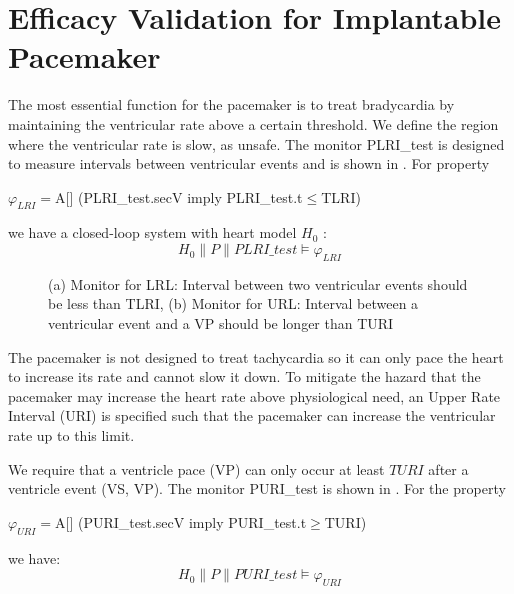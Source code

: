 \section{Efficacy Validation for Implantable Pacemaker}
The most essential function for the pacemaker is to treat bradycardia by maintaining the ventricular rate above a certain threshold. We define the region where the ventricular rate is slow, as \textsf{unsafe}. The monitor \textsf{PLRI\_test} is designed to measure intervals between ventricular events and is shown in . For property
\begin{center}
\textsf{$\varphi_{LRI}=$A[] (PLRI\_test.secV imply PLRI\_test.t$\leq$TLRI)}
\end{center}
we have a closed-loop system with heart model $H_0$ : 
$$H_0\| P\| PLRI\_test\models\varphi_{LRI}$$

\begin{figure}[t]
\centering
	\caption{(a) Monitor for LRL: Interval between two ventricular events should be less than TLRI, (b) Monitor for URL: Interval between a ventricular event and a VP should be longer than TURI}
\end{figure} 

The pacemaker is not designed to treat tachycardia so it can only pace the heart to increase its rate and cannot slow it down. To mitigate the hazard that the pacemaker may increase the heart rate above physiological need, an Upper Rate Interval (URI) is specified such that the pacemaker can increase the ventricular rate up to this limit. 
  
We require that a ventricle pace (VP) can only occur at least $TURI$ after a ventricle event (VS, VP). The monitor \textsf{PURI\_test} is shown in . For the property
\begin{center}
$\varphi_{URI}=$\textsf{A[] (PURI\_test.secV imply PURI\_test.t$\geq$TURI)}
\end{center}
we have: $$H_0\| P\| PURI\_test\models \varphi_{URI}$$

